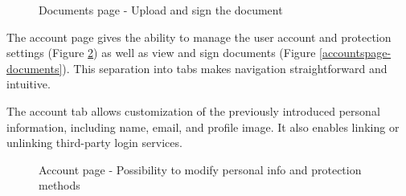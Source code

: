 \begin{figure}[H]
    \centering
    \caption{Documents page - Upload and sign the document}
    \label{documentspage2}
\end{figure}

The account page gives the ability to manage the user account and protection settings (Figure \ref{accountspage-account-protection}) as well as view and sign documents (Figure \ref{accountspage-documents}). 
This separation into tabs makes navigation straightforward and intuitive. 

The account tab allows customization of the previously introduced personal information, including name, email, and profile image. 
It also enables linking or unlinking third-party login services. 

\begin{figure}[H]
    \centering
    \caption{Account page - Possibility to modify personal info and protection methods}
    \label{accountspage-account-protection}
\end{figure}

